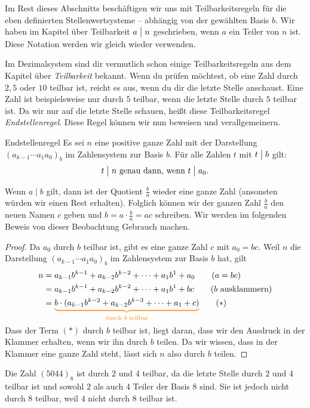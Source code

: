 \documentclass[../../main.tex]{subfiles}
\begin{document}
Im Rest dieses Abschnitts beschäftigen wir uns mit Teilbarkeitsregeln für die eben definierten Stellenwertsysteme --
abhängig von der gewählten Basis $b$. Wir haben im Kapitel über Teilbarkeit $a\divides n$ geschrieben, wenn $a$ ein
Teiler von $n$ ist. Diese Notation werden wir gleich wieder verwenden.

Im Dezimalsystem sind dir vermutlich schon einige Teilbarkeitsregeln aus dem Kapitel über \mayberef\emph{Teilbarkeit}
bekannt. Wenn du prüfen möchtest, ob eine Zahl durch $2, 5$ oder $10$ teilbar ist, reicht es aus, wenn du dir die letzte
Stelle anschaust. 
Eine Zahl ist beispielsweise nur durch $5$ teilbar, wenn die letzte Stelle durch $5$ teilbar ist. Da
wir nur auf die letzte Stelle schauen, heißt diese Teilbarkeitsregel \emph{Endstellenregel}. Diese Regel können wir nun
beweisen und verallgemeinern.
\begin{theorem}{Endstellenregel}
    Es sei $n$ eine positive ganze Zahl mit der Darstellung $(a_{k-1}\cdots a_1a_0)_b$ im Zahlensystem zur Basis $b$.
    Für alle Zahlen $t$ mit $t\divides b$ gilt:
    \[t\divides n\text{ genau dann, wenn }t\divides a_0.\]
\end{theorem}
Wenn $a\mid b$ gilt, dann ist der Quotient $\frac{b}{a}$ wieder eine ganze Zahl (ansonsten würden wir einen Rest erhalten). Folglich können wir der ganzen Zahl $\frac{b}{a}$ den neuen Namen $c$ geben und $b=a\cdot\frac{b}{a}=ac$ schreiben. Wir werden im folgenden Beweis von dieser Beobachtung Gebrauch machen.
\begin{proof}
    Da $a_0$ durch $b$ teilbar ist, gibt es eine ganze Zahl $c$ mit $a_0=bc$. Weil $n$ die Darstellung
    $(a_{k-1}\cdots a_1a_0)_b$ im Zahlensystem zur Basis $b$ hat, gilt
    \begin{align*}
        n&=a_{k-1}b^{k-1}+a_{k-2}b^{k-2}+\dots+a_1b^1+a_0\tag{$a=bc$}\\
        &=a_{k-1}b^{k-1}+a_{k-2}b^{k-2}+\dots+a_1b^1+bc\tag{$b$ ausklammern}\\
        &=\colorbrace{b\cdot(a_{k-1}b^{k-2}+a_{k-2}b^{k-3}+\dots+a_1+c)}{\text{durch }b\text{ teilbar}}\tag{$*$}
    \end{align*}
    Dass der Term $(*)$ durch $b$ teilbar ist, liegt daran, dass wir den Ausdruck in der Klammer erhalten, wenn wir ihn
    durch $b$ teilen. Da wir wissen, dass in der Klammer eine ganze Zahl steht, lässt sich $n$ also durch $b$ teilen.
\end{proof}
\begin{example}{}
    Die Zahl $(5044)_8$ ist durch $2$ und $4$ teilbar, da die letzte Stelle durch $2$ und $4$ teilbar ist und sowohl $2$
    als auch $4$ Teiler der Basis $8$ sind. Sie ist jedoch nicht durch $8$ teilbar, weil $4$ nicht durch $8$ teilbar ist.
\end{example}
\end{document}
